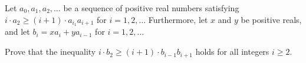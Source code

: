 Let $a_0,a_1,a_2,\ldots $ be a sequence of positive real numbers satisfying $i\cdot a_2\ge (i + 1)\cdot a_{i_1}a_{i+1}$ for $i=1, 2, \ldots $ Furthermore, let $x$ and $y$ be positive reals, and let $b_i=xa_i+ya_{i-1}$ for $i=1, 2, \ldots $

Prove that the inequality $i\cdot b_2\ge (i + 1)\cdot b_{i-1}b_{i+1}$ holds for all integers $i\ge 2$.